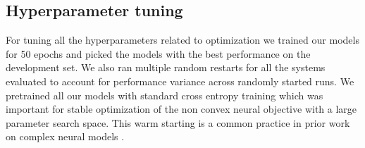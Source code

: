 \documentclass[letterpaper]{article} \usepackage{aaai18}  \usepackage{times}  \usepackage{helvet}  \usepackage{courier}  \usepackage{url}  \usepackage{graphicx}  \frenchspacing
\begin{document}
\subsection{Hyperparameter tuning}
For tuning all the hyperparameters related to optimization we trained our models for 50 epochs and picked the models with the best performance on the development set. We also ran multiple random restarts for all the systems evaluated to account for performance variance across randomly started runs. We pretrained all our models with standard cross entropy training which was important for stable optimization of the non convex neural objective with a large parameter search space. This warm starting is a common practice in prior work on complex neural models \cite{ranzato2015sequence,rush2015neural,bengioss}. 
\hspace{-0.2cm}\begin{table*}[t]\centering
\caption{Results on CCG Supertagging. Tag-level accuracy is reported in this table which is a standard evaluation metric for supertagging}
\label{super}
\end{table*}
\end{document}
